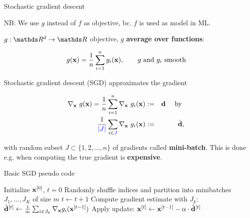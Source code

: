 \documentclass[11pt,compress,t,notes=noshow, xcolor=table]{beamer}
\begin{document}
\begin{vbframe}{Stochastic gradient descent}

NB: We use $g$ instead of $f$ as objective, bc. $f$ is used as model in ML. 

\lz 

$g: \R^d \to \R$ objective, $g$ \textbf{average over functions}: 

$$
	g(\mathbf{x}) = \frac{1}{n}\sum\limits_{i=1}^n g_i(\mathbf{x}), \qquad g \text{ and } g_i \text{ smooth}
$$

Stochastic gradient descent (SGD) approximates the gradient 

\vspace*{-0.2cm}

\begin{eqnarray*}
	\nabla_{\mathbf{x}}~ g(\mathbf{x}) = \frac{1}{n}\sum\limits_{i=1}^n \nabla_{\mathbf{x}}~g_i(\mathbf{x}) &:=& \mathbf{d} \quad \text{ by }\\
	\frac{1}{\textcolor{blue}{|J|}}\sum_{i \in \textcolor{blue}{J}} \nabla_{\mathbf{x}}~g_i(\mathbf{x}) &:=& \hat{\mathbf{d}}, 
\end{eqnarray*}

with random subset $J \subset \{1, 2, ..., n\}$ of gradients called \textbf{mini-batch}. This is done e.g. when computing the true gradient is \textbf{expensive}. 

\framebreak 

\begin{algorithm}[H]
    \footnotesize
    \caption{Basic SGD pseudo code}
    \begin{algorithmic}[1]
        \State Initialize $\mathbf{x}^{[0]}$, $t = 0$ 
        \State Randomly shuffle indices and partition into minibatches $J_1, ..., J_K$ of size $m$
        \State $t \leftarrow t + 1$ 
        \State Compute gradient estimate with $J_k$: $\hat{\mathbf{d}}^{[t]} \leftarrow \frac{1}{m} \sum_{i \in J_k} \nabla_{\mathbf{x}} g_i(\mathbf{x}^{[t - 1]}) $
        \State Apply update: $\mathbf{x}^{[t]} \leftarrow \mathbf{x}^{[t-1]} - \alpha \cdot \hat{\mathbf{d}}^{[t]}$
        
        \EndFor		
        
        \EndWhile
    \end{algorithmic}
\end{algorithm}


\end{vbframe}
\end{document}
